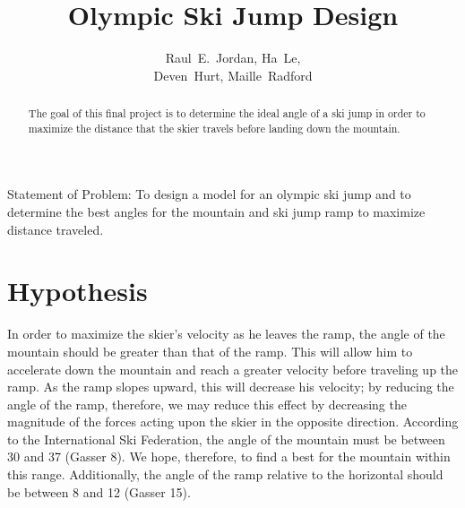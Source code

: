 \documentclass[]{IEEEphot}
\begin{document}
\title{Olympic Ski Jump Design}

\author{Raul~E.~Jordan, Ha~Le,
\\
Deven~Hurt, Maille~Radford}


%

\maketitle


\begin{receivedinfo}
\begin{center}
Statement of Problem: To design a model for an olympic ski jump and to determine the best angles for the mountain and ski jump ramp to maximize distance traveled.
\end{center}
\end{receivedinfo}

\begin{abstract}
 The goal of this final project is to determine the ideal angle of a ski jump in order to maximize the distance that the skier travels before landing down the mountain.

\end{abstract}

\section{Hypothesis}
 In order to maximize the skier’s velocity as he leaves the ramp, the angle of the mountain should be greater than that of the ramp. This will allow him to accelerate down the mountain and reach a greater velocity before traveling up the ramp. As the ramp slopes upward, this will decrease his velocity; by reducing the angle of the ramp, therefore, we may reduce this effect by decreasing the magnitude of the forces acting upon the skier in the opposite direction. According to the International Ski Federation, the angle of the mountain must be between 30 and 37 (Gasser 8). We hope, therefore, to find a best  for the mountain within this range. Additionally, the angle of the ramp relative to the horizontal should be between 8 and 12 (Gasser 15).
\end{document}
